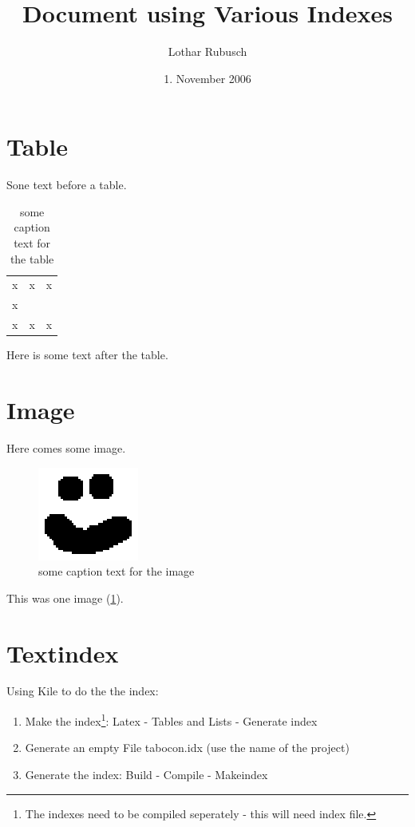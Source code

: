 \documentclass[a4paper,10pt]{scrartcl}
\title{Document using Various Indexes}
\author{Lothar Rubusch}
\date{1. November 2006}
\begin{document}
\maketitle

\tableofcontents 

\parindent0mm
\pagebreak

\section{Table}
Sone text before a table.
\begin{center}
\begin{table}[h]
\begin{tabular}{lll}
x & x & x\\
x & \cite{BLA} & \cite[foobie page 666]{HEY}\\
x & x & x\\
\end{tabular}
\caption{some caption text for the table}
\label{tab:label}
\end{table}
\end{center}
Here is some text after the table.
\pagebreak


\section{Image}
Here comes some image.
\begin{figure}[h]
 \centering
 \includegraphics[bb=14 14 65 65]{img.eps}
 \caption{some caption text for the image}
 \label{fig:label}
\end{figure}
This was one image (\ref{fig:label}).
\pagebreak


\section{Textindex}
Using Kile to do the the index:
\begin{enumerate}
 \item Make the index\footnote{The indexes need to be compiled seperately - this will need index file.}: Latex - Tables and Lists - Generate index 
 \item Generate an empty File tabocon.idx (use the name of the project) 
 \item Generate the index: Build - Compile - Makeindex 
\end{enumerate}
\end{document}
